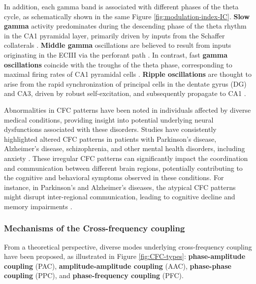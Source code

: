 \documentclass[../main.tex]{subfiles}
\begin{document}
In addition, each gamma band is associated with different phases of the theta cycle, as schematically shown in the same Figure \ref{fig:modulation-index-IC}.
\textbf{Slow gamma} activity predominates during the descending phase of the theta rhythm in the CA1 pyramidal layer, primarily driven by inputs from the Schaffer collaterals \citep{colgin_frequency_2009, belluscio_cross-frequency_2012, fernandez-ruiz_entorhinal-ca3_2017, mysin_model_2021}.
\textbf{Middle gamma} oscillations are believed to result from inputs originating in the ECIII via the perforant path \citep{lisman_how_2017, mysin_model_2021}.
In contrast, fast \textbf{gamma oscillations} coincide with the troughs of the theta phase, corresponding to maximal firing rates of CA1 pyramidal cells \citep{somogyi_temporal_2014, fernandez-ruiz_entorhinal-ca3_2017,schomburg_theta_2014}.
\textbf{Ripple oscillations} are thought to arise from the rapid synchronization of principal cells in the dentate gyrus (DG) and CA3, driven by robust self-excitation, and subsequently propagate to CA1 \citep{nakashiba2009hippocampal}.

Abnormalities in CFC patterns have been noted in individuals affected by diverse medical conditions, providing insight into potential underlying neural dysfunctions associated with these disorders.
Studies have consistently highlighted altered CFC patterns in patients with Parkinson's disease, Alzheimer's disease, schizophrenia, and other mental health disorders, including anxiety \citep{uhlhaas_neural_2006, wang2017enhanced, abubaker_working_2021, yakubov_cross-frequency_2022, bayraktaroglu_abnormal_2023}.
These irregular CFC patterns can significantly impact the coordination and communication between different brain regions, potentially contributing to the cognitive and behavioral symptoms observed in these conditions.
For instance, in Parkinson's and Alzheimer's diseases, the atypical CFC patterns might disrupt inter-regional communication, leading to cognitive decline and memory impairments \citep{yakubov_cross-frequency_2022, bayraktaroglu_abnormal_2023}.

\subsubsection{Mechanisms of the Cross-frequency coupling}
From a theoretical perspective, diverse modes underlying cross-frequency coupling have been proposed, as illustrated in Figure \ref{fig:CFC-types}: \textbf{phase-amplitude coupling} (PAC), \textbf{amplitude-amplitude coupling} (AAC), \textbf{phase-phase coupling} (PPC), and \textbf{phase-frequency coupling} (PFC).
\end{document}

